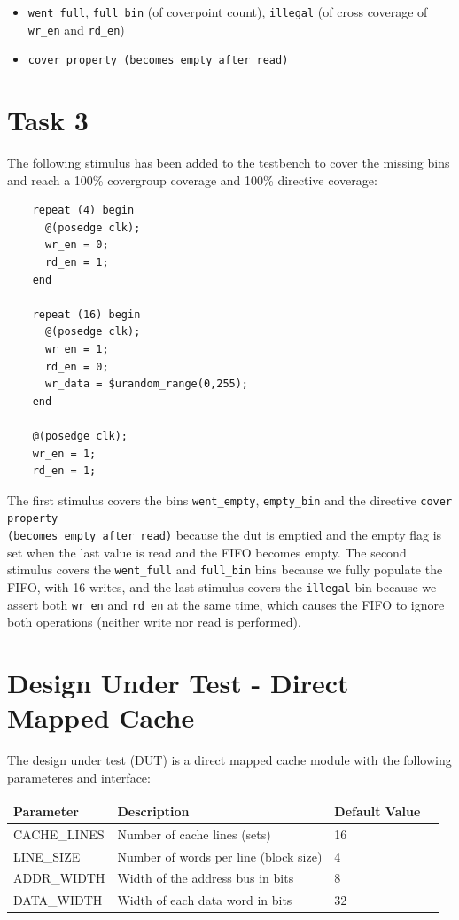 \documentclass{article}
\begin{document}
\begin{itemize}
  \item \texttt{went\_full}, \texttt{full\_bin} (of coverpoint count), \texttt{illegal} (of cross coverage of \texttt{wr\_en} and \texttt{rd\_en})
  \item \texttt{cover property (becomes\_empty\_after\_read)}
\end{itemize}

\section*{Task 3}
The following stimulus has been added to the testbench to cover the missing bins and reach a 100\% covergroup coverage and 100\% directive coverage:

\begin{verbatim}
    repeat (4) begin
      @(posedge clk);
      wr_en = 0;
      rd_en = 1;
    end

    repeat (16) begin
      @(posedge clk);
      wr_en = 1;
      rd_en = 0;
      wr_data = $urandom_range(0,255);
    end

    @(posedge clk);
    wr_en = 1;
    rd_en = 1;

\end{verbatim}
The first stimulus covers the bins \texttt{went\_empty}, \texttt{empty\_bin} and the directive \texttt{cover property \\(becomes\_empty\_after\_read)} because the dut is emptied and the empty flag is set when the last value is read and the FIFO becomes empty.
The second stimulus covers the \texttt{went\_full} and \texttt{full\_bin} bins because we fully populate the FIFO, with 16 writes, and the last stimulus covers the \texttt{illegal} bin because we assert both \texttt{wr\_en} and \texttt{rd\_en} at the same time, which causes the FIFO to ignore both operations (neither write nor read is performed).

\section*{Design Under Test - Direct Mapped Cache}
The design under test (DUT) is a direct mapped cache module with the following parameteres and interface:

\begin{table}[H]
\centering
    \begin{tabular}{|l|l|l|p{8cm}|}
    \hline
    \textbf{Parameter} & \textbf{Description} & \textbf{Default Value} \\
    \hline
    CACHE\_LINES & Number of cache lines (sets) & 16 \\
    LINE\_SIZE & Number of words per line (block size) & 4 \\
    ADDR\_WIDTH & Width of the address bus in bits & 8 \\
    DATA\_WIDTH & Width of each data word in bits & 32 \\
    \hline
    \end{tabular}
\end{table}
\end{document}
